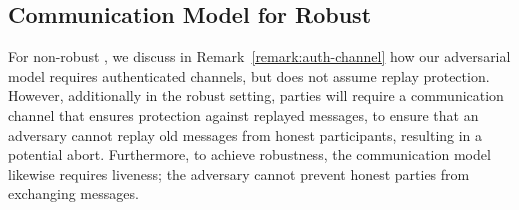 \subsection{Communication Model for Robust \glitter}

For non-robust \glitter,
we discuss in Remark~\ref{remark:auth-channel} how our adversarial model requires authenticated channels,
but does not assume replay protection.
However,
additionally in the robust setting,
parties will require a communication channel that ensures protection against replayed messages,
to ensure that an adversary cannot replay old messages from honest participants,
resulting in a potential abort.
Furthermore, to achieve robustness, the communication model likewise requires liveness;
the adversary cannot prevent honest parties from exchanging messages.

